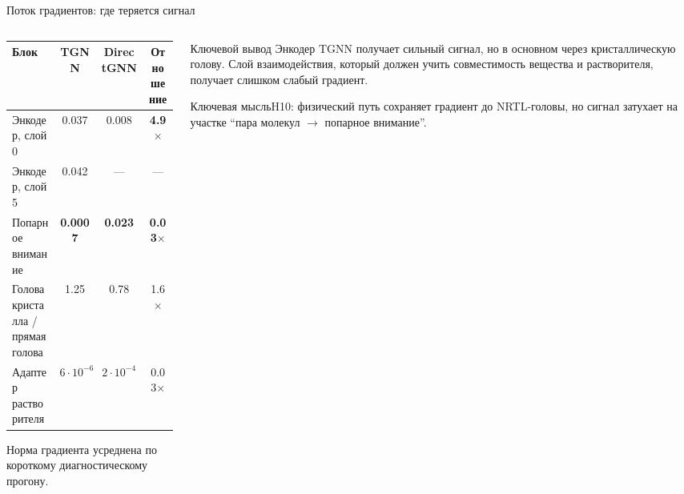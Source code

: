 \documentclass[aspectratio=169,10pt]{beamer}
\newcommand{\smallnote}[1]{{\scriptsize\color{TGSlate}#1}}
\newcommand{\keybox}[1]{\begin{block}{Ключевая мысль}#1\end{block}}
\begin{document}
\begin{frame}{Поток градиентов: где теряется сигнал}
  \small
  \begin{columns}[T,onlytextwidth]
    \begin{column}{0.55\textwidth}
      \scriptsize
      \setlength{\tabcolsep}{4pt}
      \begin{tabular}{lccc}
        \toprule
        \textbf{Блок} & \textbf{TGNN} & \textbf{DirectGNN} & \textbf{Отношение}\\
        \midrule
        Энкодер, слой 0 & 0.037 & 0.008 & \textbf{4.9$\times$}\\
        Энкодер, слой 5 & 0.042 & — & —\\
        Попарное внимание & \textbf{0.0007} & \textbf{0.023} & \textbf{0.03$\times$}\\
        Голова кристалла / прямая голова & 1.25 & 0.78 & 1.6$\times$\\
        Адаптер растворителя & $6\cdot10^{-6}$ & $2\cdot10^{-4}$ & 0.03$\times$\\
        \bottomrule
      \end{tabular}
      \vspace{0.45em}
      \smallnote{Норма градиента усреднена по короткому диагностическому прогону.}
    \end{column}
    \begin{column}{0.41\textwidth}
      \begin{block}{Ключевой вывод}
        \scriptsize
        Энкодер TGNN получает сильный сигнал, но в основном через
        кристаллическую голову. Слой взаимодействия, который должен
        учить совместимость вещества и растворителя, получает слишком
        слабый градиент.
      \end{block}
      \keybox{\scriptsize H10: физический путь сохраняет градиент до NRTL-головы,
      но сигнал затухает на участке ``пара молекул $\to$ попарное внимание''.}
    \end{column}
  \end{columns}
\end{frame}
\end{document}
